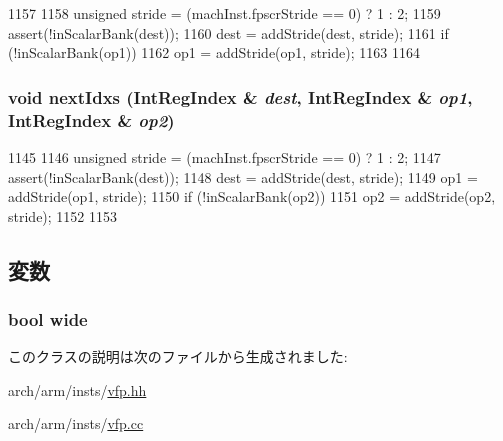 \begin{DoxyCode}
1157 {
1158     unsigned stride = (machInst.fpscrStride == 0) ? 1 : 2;
1159     assert(!inScalarBank(dest));
1160     dest = addStride(dest, stride);
1161     if (!inScalarBank(op1)) {
1162         op1 = addStride(op1, stride);
1163     }
1164 }
\end{DoxyCode}
\hypertarget{classArmISA_1_1VfpMacroOp_a9e705a53812c8caae187386eb8134f7d}{
\subsubsection[{nextIdxs}]{\setlength{\rightskip}{0pt plus 5cm}void nextIdxs ({\bf IntRegIndex} \& {\em dest}, \/  {\bf IntRegIndex} \& {\em op1}, \/  {\bf IntRegIndex} \& {\em op2})}}
\label{classArmISA_1_1VfpMacroOp_a9e705a53812c8caae187386eb8134f7d}



\begin{DoxyCode}
1145 {
1146     unsigned stride = (machInst.fpscrStride == 0) ? 1 : 2;
1147     assert(!inScalarBank(dest));
1148     dest = addStride(dest, stride);
1149     op1 = addStride(op1, stride);
1150     if (!inScalarBank(op2)) {
1151         op2 = addStride(op2, stride);
1152     }
1153 }
\end{DoxyCode}


\subsection{変数}
\hypertarget{classArmISA_1_1VfpMacroOp_a86d61e2201f65de0e7dc7999569f3380}{
\subsubsection[{wide}]{\setlength{\rightskip}{0pt plus 5cm}bool {\bf wide}}}
\label{classArmISA_1_1VfpMacroOp_a86d61e2201f65de0e7dc7999569f3380}


このクラスの説明は次のファイルから生成されました:\begin{DoxyCompactItemize}
\item 
arch/arm/insts/\hyperlink{vfp_8hh}{vfp.hh}\item 
arch/arm/insts/\hyperlink{vfp_8cc}{vfp.cc}\end{DoxyCompactItemize}
